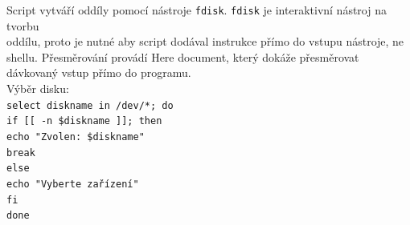 \documentclass[12pt,a4paper,twoside,]{article}
\begin{document}
{\hspace*{-1.5em}Script vytváří oddíly pomocí nástroje \texttt{fdisk}. \texttt{fdisk} je interaktivní nástroj na tvorbu \\oddílu, proto je nutné aby script dodával instrukce přímo do vstupu nástroje, ne shellu. Přesměrování provádí Here document, který dokáže přesměrovat dávkovaný vstup přímo do programu.\\ Výběr disku:}
\\ 

\texttt{\hspace*{-1.5em}select diskname in /dev/*; do\\}
\texttt{if [[ -n \$diskname ]]; then\\}
\texttt{\hspace*{2em}echo "Zvolen: \$diskname"\\}
\texttt{\hspace*{2em}break\\}
\texttt{else\\}
\texttt{\hspace*{2em}echo "Vyberte zařízení"\\}
\texttt{fi\\}
\texttt{done\\}
\end{document}
